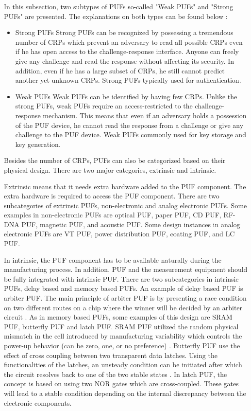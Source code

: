 In this subsection, two subtypes of PUFs so-called "Weak PUFs" and "Strong PUFs" are presented.  The explanations on both types can be found below \cite{6800561}:
\begin{itemize}
\item Strong PUFs\newline
Strong PUFs can be recognized by possessing a tremendous number of CRPs which prevent an adversary to read all possible CRPs even if he has open access to the challenge-response interface. Anyone can freely give any challenge and read the response without affecting its security. In addition, even if he has a large subset of CRPs, he still cannot predict another yet unknown CRPs. Strong PUFs typically used for authentication.
\item Weak PUFs\newline
Weak PUFs can be identified by having few CRPs. Unlike the strong PUFs, weak PUFs require an access-restricted to the challenge-response mechanism. This means that even if an adversary holds a possession of the PUF device, he cannot read the response from a challenge or give any challenge to the PUF device. Weak PUFs commonly used for key storage and key generation.
\end{itemize}

Besides the number of CRPs, PUFs can also be categorized based on their physical design. There are two major categories, extrinsic and intrinsic.

Extrinsic means that it needs extra hardware added to the PUF component. The extra hardware is required to access the PUF component. There are two subcategories of extrinsic PUFs, non-electronic and analog electronic PUFs. Some examples in non-electronic PUFs are optical PUF, paper PUF, CD PUF, RF-DNA PUF, magnetic PUF, and acoustic PUF. Some design instances in analog electronic PUFs are VT PUF, power distribution PUF, coating PUF, and LC PUF.

In intrinsic, the PUF component has to be available naturally during the manufacturing process. In addition, PUF and the measurement equipment should be fully integrated with intrinsic PUF. There are two subcategories in intrinsic PUFs, delay based and memory based PUFs. An example of delay based PUF is arbiter PUF. The main principle of arbiter PUF is by presenting a race condition on two different routes on a chip where the winner will be decided by an arbiter circuit \cite{study_of_the_art_puf}. As in memory based PUFs, some examples of this design are SRAM PUF, butterfly PUF and latch PUF. SRAM PUF utilized the random physical mismatch in the cell introduced by manufacturing variability which controls the power-up behavior (can be zero, one, or no preference) \cite{study_of_the_art_puf}. Butterfly PUF use the effect of cross coupling between two transparent data latches. Using the functionalities of the latches, an unsteady condition can be initiated after which the circuit resolves back to one of the two stable states \cite{study_of_the_art_puf}. In latch PUF, the concept is based on using two NOR gates which are cross-coupled. These gates will lead to a stable condition depending on the internal discrepancy between the electronic components.


